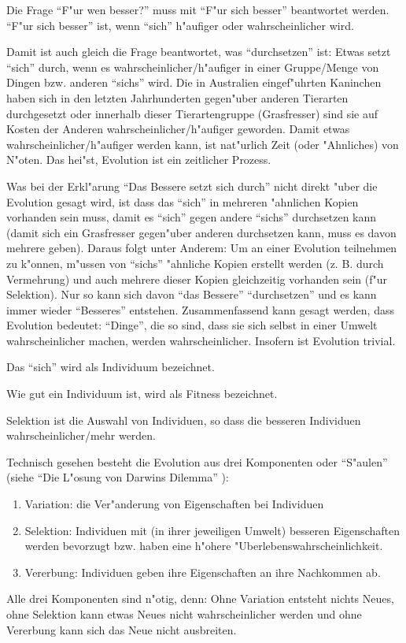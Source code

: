 Die Frage ``F"ur wen besser?'' muss mit ``F"ur sich besser'' beantwortet werden. ``F"ur sich besser'' ist, wenn ``sich'' h"aufiger oder wahrscheinlicher wird. 

Damit ist auch gleich die Frage beantwortet, was ``durchsetzen'' ist: Etwas setzt ``sich'' durch, wenn es wahrscheinlicher/h"aufiger in einer Gruppe/Menge von Dingen bzw. anderen ``sichs'' wird. Die in Australien eingef"uhrten Kaninchen haben sich in den letzten Jahrhunderten gegen"uber anderen Tierarten durchgesetzt oder innerhalb dieser Tierartengruppe (Grasfresser) sind sie auf Kosten der Anderen wahrscheinlicher/h"aufiger geworden. Damit etwas wahrscheinlicher/h"aufiger werden kann, ist nat"urlich Zeit (oder "Ahnliches) von N"oten. Das hei"st, Evolution ist ein zeitlicher Prozess.

Was bei der Erkl"arung ``Das Bessere setzt sich durch'' nicht direkt "uber die Evolution gesagt wird, ist dass das ``sich'' in mehreren "ahnlichen Kopien vorhanden sein muss, damit es ``sich'' gegen andere ``sichs'' durchsetzen kann (damit sich ein Grasfresser gegen"uber anderen durchsetzen kann, muss es davon mehrere geben). Daraus folgt unter Anderem: Um an einer Evolution teilnehmen zu k"onnen, m"ussen von ``sichs'' "ahnliche Kopien erstellt werden (z. B. durch Vermehrung) und auch mehrere dieser Kopien gleichzeitig vorhanden sein (f"ur Selektion). Nur so kann sich davon ``das Bessere'' ``durchsetzen'' und es kann immer wieder ``Besseres'' entstehen.
Zusammenfassend kann gesagt werden, dass Evolution bedeutet: ``Dinge'', die so sind, dass sie sich selbst in einer Umwelt wahrscheinlicher machen, werden wahrscheinlicher. Insofern ist Evolution trivial.

Das ``sich'' wird als Individuum bezeichnet.

Wie gut ein Individuum ist, wird als Fitness bezeichnet.

Selektion ist die Auswahl von Individuen, so dass die besseren Individuen wahrscheinlicher/mehr werden.

\bigskip\noindent
Technisch gesehen besteht die Evolution aus drei Komponenten oder ``S"aulen'' (siehe ``Die L"osung von Darwins Dilemma'' \cite{LDD_2007}):
\begin{enumerate}
 \item Variation: die Ver"anderung von Eigenschaften bei Individuen
 \item Selektion: Individuen mit (in ihrer jeweiligen Umwelt) besseren Eigenschaften werden bevorzugt bzw. haben eine h"ohere "Uberlebenswahrscheinlichkeit.
 \item Vererbung: Individuen geben ihre Eigenschaften an ihre Nachkommen ab.
\end{enumerate}
Alle drei Komponenten sind n"otig, denn: Ohne Variation entsteht nichts Neues, ohne Selektion kann etwas Neues nicht wahrscheinlicher werden und ohne Vererbung kann sich das Neue nicht ausbreiten.

